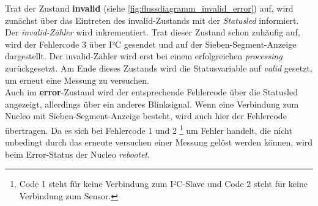 \documentclass[11pt,a4paper,titlepage]{article}
\begin{document}
Trat der Zustand \textbf{invalid} (siehe \cref{fig:flussdiagramm_invalid_error}) auf,
wird zunächst über das Eintreten des invalid-Zustands mit der \textit{Statusled} informiert.
Der \textit{invalid-Zähler} wird inkrementiert.
Trat dieser Zustand schon zuhäufig auf, wird der Fehlercode 3 über I²C gesendet und auf der Sieben-Segment-Anzeige dargestellt.
Der invalid-Zähler wird erst bei einem erfolgreichen \textit{processing} zurückgesetzt.
Am Ende dieses Zustands wird die Statusvariable auf \textit{valid} gesetzt, um erneut eine Messung zu versuchen.\\

Auch im \textbf{error}-Zustand wird der entsprechende Fehlercode über die Statusled angezeigt, allerdings über ein anderes Blinksignal.
Wenn eine Verbindung zum Nucleo mit Sieben-Segment-Anzeige besteht, wird auch hier der Fehlercode übertragen.
Da es sich bei Fehlercode 1 und 2
\footnote{Code 1 steht für keine Verbindung zum I²C-Slave und Code 2 steht für keine Verbindung zum Sensor.}
um Fehler handelt, die nicht unbedingt durch das erneute versuchen einer Messung gelöst werden können,
wird beim Error-Status der Nucleo \textit{rebootet}.\\
\end{document}
